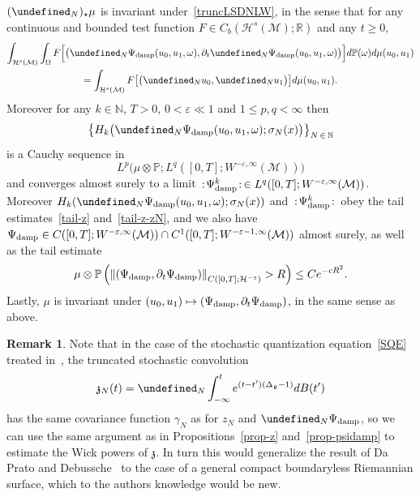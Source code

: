 \documentclass[10pt]{amsart}
\theoremstyle{definition}\newtheorem{defi}[theo]{Definition}\newtheorem{rema}[theo]{Remark}\newtheorem{exam}[theo]{Example}\newtheorem{exem}[theo]{Example}\newtheorem{nota}[theo]{Notation}
\newcommand{\damp}{\textup{damp}}
\newcommand{\R}{\mathbb{R}}
\newcommand{\Prob}{\mathbb{P}}
\newcommand{\N}{\mathbb{N}}
\let\P= \undefined
\newcommand{\P}{\mathbf{P}}
\newcommand{\M}{\mathcal{M}}
\renewcommand{\H}{\mathcal{H}}
\newcommand{\g}{\mathfrak{g}}
\newcommand{\frkz}{\mathfrak{z}}
\newcommand{\Dlg}{\Delta_{\g}}
\newcommand{\eps}{\varepsilon}
\newcommand{\s}{\sigma}
\newcommand{\dt}{\partial_t}
\renewcommand{\o}{\omega}
\renewcommand{\O}{\Omega}
\begin{document}
\begin{prop}\label{prop-psidamp}
$(\P_N)_{\star}\mu$ is invariant under~\eqref{truncLSDNLW}, in the sense that for any continuous and bounded test function $F\in C_b(\H^s(\M);\R)$ and any $t\ge 0$,
\begin{multline*}
\int_{\H^s(\M)}\int_\O F\Big[\big(\P_N\Psi_\damp(u_0,u_1,\o),\dt\P_N\Psi_\damp(u_0,u_1,\o)\big)\Big]d\Prob(\o)d\mu(u_0,u_1)\\
 = \int_{\H^s(\M)}F\big[\big(\P_Nu_0,\P_Nu_1\big)\big]d\mu(u_0,u_1).
\end{multline*}
Moreover for any $k\in\N$, $T>0$, $0<\eps\ll1$ and $1\leq p,q <\infty$ then
\[
\big\{H_k\big(\P_N\Psi_{\damp}(u_0,u_1,\o);\s_N(x)\big)\big\}_{N\,\in\,\N}
\]
is a Cauchy sequence in
\begin{equation*}
L^p\big(\mu\otimes\Prob;L^q([0,T];W^{-\eps,\infty}(\M))\big)
\end{equation*}
and converges almost surely to a limit $\,:\!\Psi_{\damp}^k\!:\,\in L^q([0,T];W^{-\eps,\infty}(\M))$. Moreover $H_k(\P_N\Psi_{\damp}(u_0,u_1,\o);\s_N(x))$ and $\,:\!\Psi_{\damp}^k\!:\,$ obey the tail estimates~\eqref{tail-z} and~\eqref{tail-z-zN}, and we also have $\Psi_{\damp}\in C([0,T];W^{-\eps,\infty}(\M))\cap C^1([0,T];W^{-\eps-1,\infty}(\M))$ almost surely, as well as the tail estimate
\begin{equation}\label{tail-sup}
\mu\otimes\Prob\left(\left\|(\Psi_{\damp},\dt\Psi_\damp)\right\|_{C\left([0,T];\H^{-\eps}\right)}>R\right)\leq Ce^{-cR^2}.
\end{equation}
Lastly, $\mu$ is invariant under $(u_0,u_1)\mapsto (\Psi_\damp,\dt\Psi_\damp)$, in the same sense as above.
\end{prop}

\begin{rema}\label{rk-SQE}
Note that in the case of the stochastic quantization equation~\eqref{SQE} treated in~\cite{DPD}, the truncated stochastic convolution
\begin{equation*}
\frkz_N(t) = \P_N\int_{-\infty}^t e^{(t-t')(\Dlg-1)}dB(t')
\end{equation*}
has the same covariance function $\gamma_N$ as for $z_N$ and $\P_N\Psi_{\damp}$, so we can use the same argument as in Propositions~\ref{prop-z} and~\ref{prop-psidamp} to estimate the Wick powers of $\frkz$. In turn this would generalize the result of Da Prato and Debussche~\cite{DPD} to the case of a general compact boundaryless Riemannian surface, which to the authors knowledge would be new.
\end{rema}
\end{document}
